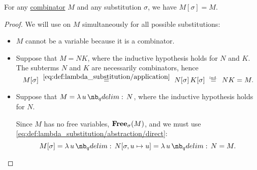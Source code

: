 \begin{proposition}\label{thm:lambda_substitution_combinators}
  For any \hyperref[def:lambda_combinator]{combinator} \( M \) and any substitution \( \sigma \), we have \( M[\sigma] = M \).
\end{proposition}
\begin{proof}
  We will use  on \( M \) simultaneously for all possible substitutions:
  \begin{itemize}
    \item \( M \) cannot be a variable because it is a combinator.
    \item Suppose that \( M = NK \), where the inductive hypothesis holds for \( N \) and \( K \). The subterms \( N \) and \( K \) are necessarily combinators, hence
    \begin{equation*}
      M[\sigma]
      \reloset {\eqref{eq:def:lambda_substitution/application}} =
      N[\sigma] \thinspace K[\sigma]
      \reloset {\T{ind.}} =
      N K
      =
      M.
    \end{equation*}

    \item Suppose that \( M = \qabs u N \), where the inductive hypothesis holds for \( N \).

    Since \( M \) has no free variables, \( \op*{Free}_\sigma(M) \), and we must use \eqref{eq:def:lambda_substitution/abstraction/direct}:
    \begin{equation*}
      M[\sigma] = \qabs u N[\sigma, u \mapsto u] = \qabs u N = M.
    \end{equation*}
  \end{itemize}
\end{proof}

